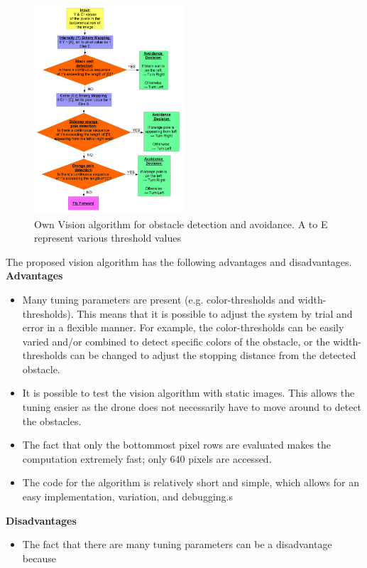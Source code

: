 \begin{figure}[H]
	\centering
	\includegraphics[width = 0.5\textwidth]{Figures/vision.png}
	\caption{Own Vision algorithm for obstacle detection and avoidance. A to E represent various threshold values}
	\label{own_vision}
\end{figure}

The proposed vision algorithm has the following advantages and disadvantages.\\

\textbf{Advantages}
\begin{itemize}
	\item Many tuning parameters are present (e.g. color-thresholds and width-thresholds). This means that it is possible to adjust the system by trial and error in a flexible manner. For example, the color-thresholds can be easily varied and/or combined to detect specific colors of the obstacle, or the width-thresholds can be changed to adjust the stopping distance from the detected obstacle.
	\item It is possible to test the vision algorithm with static images. This allows the tuning easier as the drone does not necessarily have to move around to detect the obstacles.
	\item The fact that only the bottommost pixel rows are evaluated makes the computation extremely fast; only 640 pixels are accessed.
	\item The code for the algorithm is relatively short and simple, which allows for an easy implementation, variation, and debugging.s
\end{itemize}
\textbf{Disadvantages}
\begin{itemize}
	\item The fact that there are many tuning parameters can be a disadvantage because 
\end{itemize}